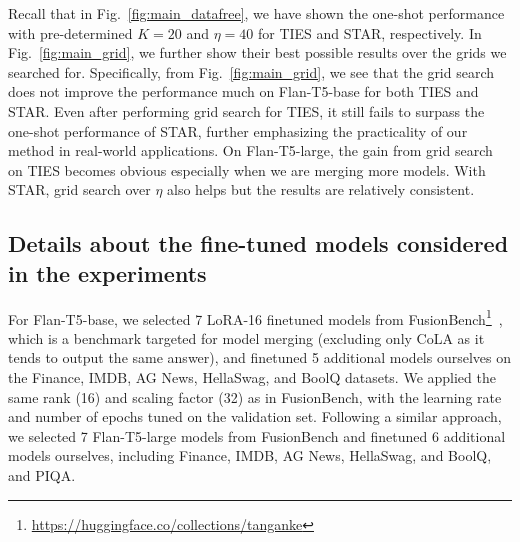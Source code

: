 Recall that in Fig.~\ref{fig:main_datafree}, we have shown the one-shot performance with pre-determined $K=20$ and $\eta=40$ for TIES and STAR, respectively. In Fig.~\ref{fig:main_grid}, we further show their best possible results over the grids we searched for. Specifically, from Fig.~\ref{fig:main_grid}, we see that the grid search does not improve the performance much on Flan-T5-base for both TIES and STAR. Even after performing grid search for TIES, it still fails to surpass the one-shot performance of STAR, further emphasizing the practicality of our method in real-world applications. On Flan-T5-large, the gain from grid search on TIES becomes obvious especially when we are merging more models. With STAR, grid search over $\eta$ also helps but the results are relatively consistent.







\subsection{Details about the fine-tuned models considered in the experiments}\label{app:detail}
\label{subsec:experiment_details}
For Flan-T5-base, we selected 7 LoRA-16 finetuned models from FusionBench\footnote{\url{https://huggingface.co/collections/tanganke}}~\cite{tang2024fusionbench}, which is a benchmark targeted for model merging (excluding only CoLA as it tends to output the same answer), and finetuned 5 additional models ourselves on the Finance, IMDB, AG News, HellaSwag, and BoolQ datasets. We applied the same rank (16) and scaling factor (32) as in FusionBench, with the learning rate and number of epochs tuned on the validation set. Following a similar approach, we selected 7 Flan-T5-large models from FusionBench and finetuned 6 additional models ourselves, including Finance, IMDB, AG News, HellaSwag, and BoolQ, and PIQA.

